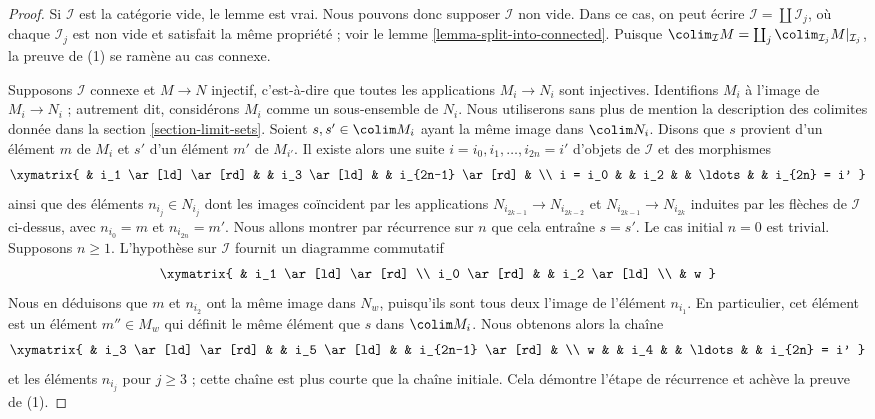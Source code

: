 \begin{proof}
Si $\mathcal{I}$ est la catégorie vide, le lemme est vrai.
Nous pouvons donc supposer $\mathcal{I}$ non vide. Dans ce cas,
on peut écrire $\mathcal{I} = \coprod \mathcal{I}_j$, où chaque
$\mathcal{I}_j$ est non vide et satisfait la même propriété ; voir le
lemme \ref{lemma-split-into-connected}. Puisque
$\colim_\mathcal{I} M = \coprod_j \colim_{\mathcal{I}_j} M|_{\mathcal{I}_j}$,
la preuve de (1) se ramène au cas connexe.

\medskip\noindent
Supposons $\mathcal{I}$ connexe et $M \to N$ injectif, c'est-à-dire
que toutes les applications $M_i \to N_i$ sont injectives.
Identifions $M_i$ à l'image de $M_i \to N_i$ ; autrement dit,
considérons $M_i$ comme un sous-ensemble de $N_i$.
Nous utiliserons sans plus de mention la description des colimites donnée
dans la section \ref{section-limit-sets}.
Soient $s, s' \in \colim M_i$ ayant la même image dans $\colim N_i$.
Disons que $s$ provient d'un élément $m$ de $M_i$ et $s'$ d'un
élément $m'$ de $M_{i'}$. Il existe alors une suite
$i = i_0, i_1, \ldots, i_{2n} = i'$ d'objets de $\mathcal{I}$
et des morphismes
$$
\xymatrix{
&
i_1 \ar[ld] \ar[rd] & &
i_3 \ar[ld] & &
i_{2n-1} \ar[rd] & \\
i = i_0 & &
i_2 & &
\ldots & &
i_{2n} = i'
}
$$
ainsi que des éléments $n_{i_j} \in N_{i_j}$ dont les images coïncident
par les applications $N_{i_{2k-1}} \to N_{i_{2k-2}}$ et
$N_{i_{2k-1}}
\to N_{i_{2k}}$ induites par les flèches de
$\mathcal{I}$ ci-dessus, avec $n_{i_0} = m$ et $n_{i_{2n}} = m'$.
Nous allons montrer par récurrence sur $n$ que cela entraîne $s = s'$.
Le cas initial $n = 0$ est trivial. Supposons $n \geq 1$.
L'hypothèse sur $\mathcal{I}$ fournit un diagramme commutatif
$$
\xymatrix{
& i_1 \ar[ld] \ar[rd] \\
i_0 \ar[rd] & & i_2 \ar[ld] \\
& w
}
$$
Nous en déduisons que $m$ et $n_{i_2}$ ont la même image dans $N_w$,
puisqu'ils sont tous deux l'image de l'élément $n_{i_1}$.
En particulier, cet élément est un élément $m'' \in M_w$ qui
définit le même élément que $s$ dans $\colim M_i$.
Nous obtenons alors la chaîne
$$
\xymatrix{
&
i_3 \ar[ld] \ar[rd] & &
i_5 \ar[ld] & &
i_{2n-1} \ar[rd] & \\
w & &
i_4 & &
\ldots & &
i_{2n} = i'
}
$$
et les éléments $n_{i_j}$ pour $j \geq 3$ ; cette chaîne est plus courte
que la chaîne initiale. Cela démontre l'étape de récurrence et achève
la preuve de (1).


\end{proof}
